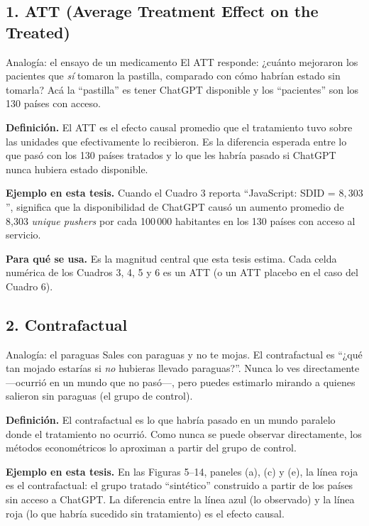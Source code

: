 \documentclass[11pt,a4paper]{article}
\begin{document}
\subsection*{1. ATT (Average Treatment Effect on the Treated)}

\begin{ideabox}{Analogía: el ensayo de un medicamento}
El ATT responde: ¿cuánto mejoraron los pacientes que \emph{sí} tomaron la pastilla, comparado con cómo habrían estado sin tomarla? Acá la ``pastilla'' es tener ChatGPT disponible y los ``pacientes'' son los 130 países con acceso.
\end{ideabox}

\textbf{Definición.} El ATT es el efecto causal promedio que el tratamiento tuvo sobre las unidades que efectivamente lo recibieron. Es la diferencia esperada entre lo que pasó con los 130 países tratados y lo que les habría pasado si ChatGPT nunca hubiera estado disponible.

\textbf{Ejemplo en esta tesis.} Cuando el Cuadro 3 reporta ``JavaScript: SDID = $8{,}303$'', significa que la disponibilidad de ChatGPT causó un aumento promedio de 8{,}303 \textit{unique pushers} por cada 100\,000 habitantes en los 130 países con acceso al servicio.

\textbf{Para qué se usa.} Es la magnitud central que esta tesis estima. Cada celda numérica de los Cuadros 3, 4, 5 y 6 es un ATT (o un ATT placebo en el caso del Cuadro 6).

\subsection*{2. Contrafactual}

\begin{ideabox}{Analogía: el paraguas}
Sales con paraguas y no te mojas. El contrafactual es ``¿qué tan mojado estarías si \emph{no} hubieras llevado paraguas?''. Nunca lo ves directamente —ocurrió en un mundo que no pasó—, pero puedes estimarlo mirando a quienes salieron sin paraguas (el grupo de control).
\end{ideabox}

\textbf{Definición.} El contrafactual es lo que habría pasado en un mundo paralelo donde el tratamiento no ocurrió. Como nunca se puede observar directamente, los métodos econométricos lo aproximan a partir del grupo de control.

\textbf{Ejemplo en esta tesis.} En las Figuras 5--14, paneles (a), (c) y (e), la línea roja es el contrafactual: el grupo tratado ``sintético'' construido a partir de los países sin acceso a ChatGPT. La diferencia entre la línea azul (lo observado) y la línea roja (lo que habría sucedido sin tratamiento) es el efecto causal.
\end{document}
